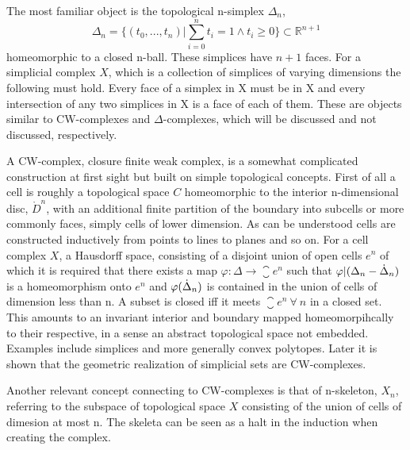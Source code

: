 \documentclass[../../main.tex]{subfiles}
\begin{document}
    The most familiar object is the topological n-simplex $\Delta_n$,
    \begin{equation}
        \Delta_n = \{(t_0, . . . , t_n)  |\sum_{i=0}^{n}t_i=1 \wedge t_i \geq 0\} \subset \mathbb{R}^{n+1}
    \end{equation}
    homeomorphic to a closed n-ball. These simplices have $n+1$ faces. For a simplicial complex $X$, which is a collection of simplices of varying dimensions the following must hold. Every face of a simplex in X must be in X and every intersection of any two simplices in X is a face of each of them. These are objects similar to CW-complexes and $\Delta$-complexes, which will be discussed and not discussed, respectively.
    
    A CW-complex, closure finite weak complex, is a somewhat complicated construction at first sight but built on simple topological concepts. First of all a cell is roughly a topological space $C$ homeomorphic to the interior n-dimensional disc, $\mathring{D}^n$, with an additional finite partition of the boundary into subcells or more commonly faces, simply cells of lower dimension. As can be understood cells are constructed inductively from points to lines to planes and so on. For a cell complex $X$, a Hausdorff space, consisting of a disjoint union of open cells $e^n$ of which it is required that there exists a map $\varphi:\Delta\to\closure{e}^n$ such that $\varphi|(\Delta_n - \dot{\Delta}_n )$ is a homeomorphism onto $e^n$ and $\varphi(\dot{\Delta}_n)$ is contained in the union of cells of dimension less than n. A subset is closed iff it meets $\closure{e}^n\:\forall \:n$ in a closed set. This amounts to an invariant interior and boundary mapped homeomorpihcally to their respective, in a sense an abstract topological space not embedded. Examples include simplices and more generally convex polytopes. Later it is shown that the geometric realization of simplicial sets are CW-complexes.
    
    Another relevant concept connecting to CW-complexes is that of n-skeleton, $X_n$, referring to the subspace of topological space $X$ consisting of the union of cells of dimesion at most n. The skeleta can be seen as a halt in the induction when creating the complex.  
    
    
\end{document}
